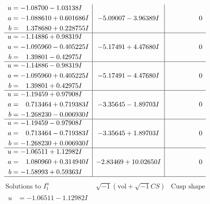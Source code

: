\documentclass[1p]{elsarticle_modified}
\theoremstyle{definition}
\newcommand{\I}{\sqrt{-1}}
\begin{document}
$$\begin{array}{c|c|c}
\begin{aligned}
u &= -1.08700 - 1.03138 I \\
a &= -1.088610 + 0.601686 I \\
b &= \phantom{-}1.378680 + 0.228755 I\end{aligned}
 & -5.09007 - 3.96389 I & \phantom{-0.000000 } 0 \\ \hline\begin{aligned}
u &= -1.14886 + 0.98319 I \\
a &= -1.095960 - 0.405225 I \\
b &= \phantom{-}1.39801 - 0.42975 I\end{aligned}
 & -5.17491 + 4.47680 I & \phantom{-0.000000 } 0 \\ \hline\begin{aligned}
u &= -1.14886 - 0.98319 I \\
a &= -1.095960 + 0.405225 I \\
b &= \phantom{-}1.39801 + 0.42975 I\end{aligned}
 & -5.17491 - 4.47680 I & \phantom{-0.000000 } 0 \\ \hline\begin{aligned}
u &= -1.19459 + 0.97908 I \\
a &= \phantom{-}0.713464 + 0.719383 I \\
b &= -1.268230 - 0.006930 I\end{aligned}
 & -3.35645 - 1.89703 I & \phantom{-0.000000 } 0 \\ \hline\begin{aligned}
u &= -1.19459 - 0.97908 I \\
a &= \phantom{-}0.713464 - 0.719383 I \\
b &= -1.268230 + 0.006930 I\end{aligned}
 & -3.35645 + 1.89703 I & \phantom{-0.000000 } 0 \\ \hline\begin{aligned}
u &= -1.06511 + 1.12982 I \\
a &= \phantom{-}1.080960 + 0.314940 I \\
b &= -1.58993 + 0.59363 I\end{aligned}
 & -2.83469 + 10.02650 I & \phantom{-0.000000 } 0\\
 \hline 
 \end{array}$$\newpage$$\begin{array}{c|c|c}  
\text{Solutions to }I^u_{1}& \I (\text{vol} + \sqrt{-1}CS) & \text{Cusp shape}\\
 \hline 
\begin{aligned}
u &= -1.06511 - 1.12982 I \\

\end{aligned}
\end{array}$$
\end{document}
